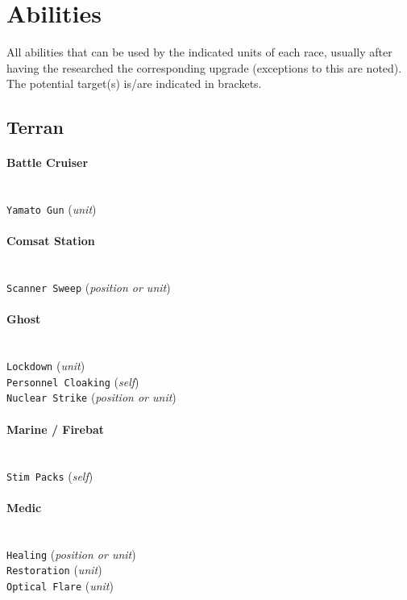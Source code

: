 \newpage
\section{Abilities}
\label{abilities}
All abilities that can be used by the indicated units of each race, usually after having the researched the corresponding upgrade (exceptions to this are noted). The potential target(s) is/are indicated in brackets.

\subsection{Terran}

\paragraph{Battle Cruiser} \mbox{}\\
\verb|Yamato Gun| (\textit{unit}) \\

\paragraph{Comsat Station} \mbox{}\\
\verb|Scanner Sweep| (\textit{position or unit}) \\

\paragraph{Ghost} \mbox{}\\
\verb|Lockdown| (\textit{unit}) \\
\verb|Personnel Cloaking| (\textit{self}) \\
\verb|Nuclear Strike| (\textit{position or unit})

\paragraph{Marine / Firebat} \mbox{}\\
\verb|Stim Packs| (\textit{self})

\paragraph{Medic} \mbox{}\\
\verb|Healing| (\textit{position or unit}) \\
\verb|Restoration| (\textit{unit}) \\
\verb|Optical Flare| (\textit{unit})

